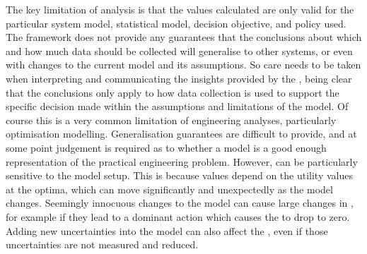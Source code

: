 
The key limitation of  analysis is that the  values calculated are only valid for the particular system model, statistical model, decision objective, and policy used. The framework does not provide any guarantees that the conclusions about which and how much data should be collected will generalise to other systems, or even with changes to the current model and its assumptions. So care needs to be taken when interpreting and communicating the insights provided by the , being clear that the conclusions only apply to how data collection is used to support the specific decision made within the assumptions and limitations of the model. Of course this is a very common limitation of engineering analyses, particularly optimisation modelling. Generalisation guarantees are difficult to provide, and at some point judgement is required as to whether a model is a good enough representation of the practical engineering problem. However,  can be particularly sensitive to the model setup. This is because  values depend on the utility values at the optima, which can move significantly and unexpectedly as the model changes. Seemingly innocuous changes to the model can cause large changes in , for example if they lead to a dominant action which causes the  to drop to zero. Adding new uncertainties into the model can also affect the , even if those uncertainties are not measured and reduced.


